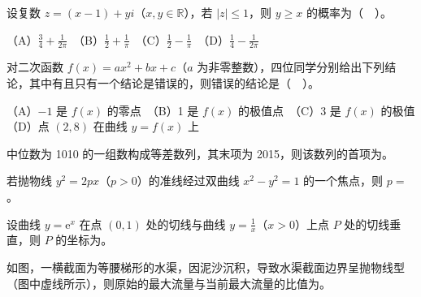 \begin{question}

设复数 $z=(x-1)+yi$（$x,y\in\mathbb R$），若 $|z|\leq1$，则 $y\geq x$ 的概率为（　）。

    （A）$\frac34+\frac1{2\pi}$　（B）$\frac12+\frac1\pi$　（C）$\frac12-\frac1\pi$　（D）$\frac14-\frac1{2\pi}$

\end{question}
\begin{question}

对二次函数 $f(x)=ax^2+bx+c$（$a$ 为非零整数），四位同学分别给出下列结论，其中有且只有一个结论是错误的，则错误的结论是（　）。

    （A）$-1$ 是 $f(x)$ 的零点　（B）1 是 $f(x)$ 的极值点　（C）3 是 $f(x)$ 的极值　（D）点 $(2,8)$ 在曲线 $y=f(x)$ 上

\end{question}

\begin{question}

中位数为 1010 的一组数构成等差数列，其末项为 2015，则该数列的首项为\gkblank{}。

\end{question}
\begin{question}

若抛物线 $y^2=2px$（$p>0$）的准线经过双曲线 $x^2-y^2=1$ 的一个焦点，则 $p=$\gkblank{}。

\end{question}
\begin{question}

设曲线 $y=\mathrm e^x$ 在点 $(0,1)$ 处的切线与曲线 $y=\frac1x$（$x>0$）上点 $P$ 处的切线垂直，则 $P$ 的坐标为\gkblank{}。

\Needspace{0.4\textheight}
\end{question}
\begin{question}

如图，一横截面为等腰梯形的水渠，因泥沙沉积，导致水渠截面边界呈抛物线型（图中虚线所示），则原始的最大流量与当前最大流量的比值为\gkblank{}。
\nopagebreak[4]
\begin{center}\end{center}
\nopagebreak[4]
\end{question}

